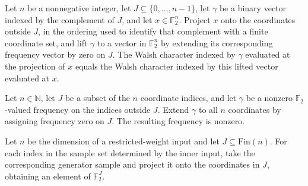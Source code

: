 \begin{theorem}
\label{FABL.vectorWalshCharacter_fixedCoordinateProjection}
\leanok
{}
Let $n$ be a nonnegative integer, let $J\subseteq\{0,\ldots,n-1\}$, let $\gamma$ be a
binary vector indexed by the complement of $J$, and let $x\in\mathbb F_2^n$. Project $x$
onto the coordinates outside $J$, in the ordering used to identify that complement with
a finite coordinate set, and lift $\gamma$ to a vector in $\mathbb F_2^n$ by extending
its corresponding frequency vector by zero on $J$. The Walsh character indexed by
$\gamma$ evaluated at the projection of $x$ equals the Walsh character indexed by this
lifted vector evaluated at $x$.
\end{theorem}

\begin{theorem}
\label{FABL.fixedCoordinateFrequencyLift_ne_zero}
\leanok
{}
Let $n\in\mathbb{N}$, let $J$ be a subset of the $n$ coordinate indices, and let
$\gamma$ be a nonzero $\mathbb{F}_2$-valued frequency on the indices outside $J$. Extend
$\gamma$ to all $n$ coordinates by assigning frequency zero on $J$. The resulting
frequency is nonzero.
\end{theorem}

\begin{definition}
\label{FABL.restrictedWeightFreeSample}
\leanok
{}
Let $n$ be the dimension of a restricted-weight input and let
$J\subseteq\mathrm{Fin}(n)$. For each index in the sample set determined by the inner
input, take the corresponding generator sample and project it onto the coordinates in
$J$, obtaining an element of $\mathbb{F}_2^J$.
\end{definition}

